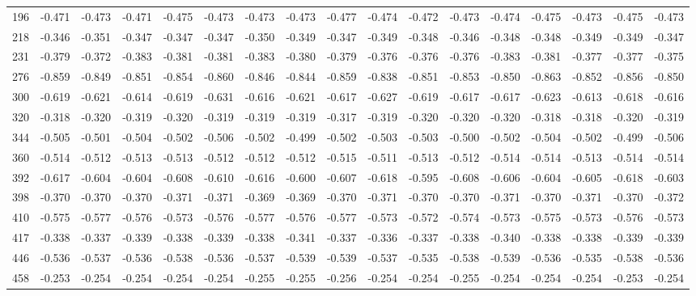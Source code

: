 \documentclass{amsart}
\begin{document}
\begin{landscape}
\begin{longtable}{rrrrrrrrrrrrrrrrr}
  196 & -0.471 & -0.473 & -0.471 & -0.475 & -0.473 & -0.473 & -0.473 & -0.477 & -0.474 & -0.472 & -0.473 & -0.474 & -0.475 & -0.473 & -0.475 & -0.473 \\ 
  218 & -0.346 & -0.351 & -0.347 & -0.347 & -0.347 & -0.350 & -0.349 & -0.347 & -0.349 & -0.348 & -0.346 & -0.348 & -0.348 & -0.349 & -0.349 & -0.347 \\ 
  231 & -0.379 & -0.372 & -0.383 & -0.381 & -0.381 & -0.383 & -0.380 & -0.379 & -0.376 & -0.376 & -0.376 & -0.383 & -0.381 & -0.377 & -0.377 & -0.375 \\ 
  276 & -0.859 & -0.849 & -0.851 & -0.854 & -0.860 & -0.846 & -0.844 & -0.859 & -0.838 & -0.851 & -0.853 & -0.850 & -0.863 & -0.852 & -0.856 & -0.850 \\ 
  300 & -0.619 & -0.621 & -0.614 & -0.619 & -0.631 & -0.616 & -0.621 & -0.617 & -0.627 & -0.619 & -0.617 & -0.617 & -0.623 & -0.613 & -0.618 & -0.616 \\ 
  320 & -0.318 & -0.320 & -0.319 & -0.320 & -0.319 & -0.319 & -0.319 & -0.317 & -0.319 & -0.320 & -0.320 & -0.320 & -0.318 & -0.318 & -0.320 & -0.319 \\ 
  344 & -0.505 & -0.501 & -0.504 & -0.502 & -0.506 & -0.502 & -0.499 & -0.502 & -0.503 & -0.503 & -0.500 & -0.502 & -0.504 & -0.502 & -0.499 & -0.506 \\ 
  360 & -0.514 & -0.512 & -0.513 & -0.513 & -0.512 & -0.512 & -0.512 & -0.515 & -0.511 & -0.513 & -0.512 & -0.514 & -0.514 & -0.513 & -0.514 & -0.514 \\ 
  392 & -0.617 & -0.604 & -0.604 & -0.608 & -0.610 & -0.616 & -0.600 & -0.607 & -0.618 & -0.595 & -0.608 & -0.606 & -0.604 & -0.605 & -0.618 & -0.603 \\ 
  398 & -0.370 & -0.370 & -0.370 & -0.371 & -0.371 & -0.369 & -0.369 & -0.370 & -0.371 & -0.370 & -0.370 & -0.371 & -0.370 & -0.371 & -0.370 & -0.372 \\ 
  410 & -0.575 & -0.577 & -0.576 & -0.573 & -0.576 & -0.577 & -0.576 & -0.577 & -0.573 & -0.572 & -0.574 & -0.573 & -0.575 & -0.573 & -0.576 & -0.573 \\ 
  417 & -0.338 & -0.337 & -0.339 & -0.338 & -0.339 & -0.338 & -0.341 & -0.337 & -0.336 & -0.337 & -0.338 & -0.340 & -0.338 & -0.338 & -0.339 & -0.339 \\ 
  446 & -0.536 & -0.537 & -0.536 & -0.538 & -0.536 & -0.537 & -0.539 & -0.539 & -0.537 & -0.535 & -0.538 & -0.539 & -0.536 & -0.535 & -0.538 & -0.536 \\ 
  458 & -0.253 & -0.254 & -0.254 & -0.254 & -0.254 & -0.255 & -0.255 & -0.256 & -0.254 & -0.254 & -0.255 & -0.254 & -0.254 & -0.254 & -0.253 & -0.254 \\ 

\end{longtable}
\end{landscape}
\end{document}
